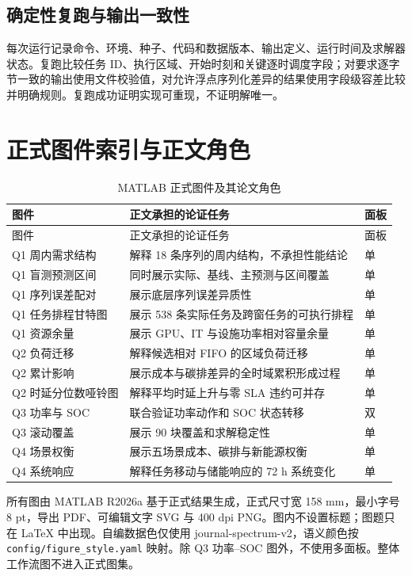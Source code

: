 \subsection{确定性复跑与输出一致性}

每次运行记录命令、环境、种子、代码和数据版本、输出定义、运行时间及求解器状态。复跑比较任务 ID、执行区域、开始时刻和关键逐时调度字段；对要求逐字节一致的输出使用文件校验值，对允许浮点序列化差异的结果使用字段级容差比较并明确规则。复跑成功证明实现可重现，不证明解唯一。

\section{正式图件索引与正文角色}

\begin{longtable}{@{}p{}p{}p{}@{}}
\caption{MATLAB 正式图件及其论文角色}\label{tab:figure-index}\\
\toprule
图件 & 正文承担的论证任务 & 面板 \\
\midrule
\endfirsthead
\toprule
图件 & 正文承担的论证任务 & 面板 \\
\midrule
\endhead
Q1 周内需求结构 & 解释 18 条序列的周内结构，不承担性能结论 & 单 \\
Q1 盲测预测区间 & 同时展示实际、基线、主预测与区间覆盖 & 单 \\
Q1 序列误差配对 & 展示底层序列误差异质性 & 单 \\
Q1 任务排程甘特图 & 展示 538 条实际任务及跨窗任务的可执行排程 & 单 \\
Q1 资源余量 & 展示 GPU、IT 与设施功率相对容量余量 & 单 \\
Q2 负荷迁移 & 解释候选相对 FIFO 的区域负荷迁移 & 单 \\
Q2 累计影响 & 展示成本与碳排差异的全时域累积形成过程 & 单 \\
Q2 时延分位数哑铃图 & 解释平均时延上升与零 SLA 违约可并存 & 单 \\
Q3 功率与 SOC & 联合验证功率动作和 SOC 状态转移 & 双 \\
Q3 滚动覆盖 & 展示 90 块覆盖和求解稳定性 & 单 \\
Q4 场景权衡 & 展示五场景成本、碳排与新能源权衡 & 单 \\
Q4 系统响应 & 解释任务移动与储能响应的 72 h 系统变化 & 单 \\
\bottomrule
\end{longtable}

所有图由 MATLAB R2026a 基于正式结果生成，正式尺寸宽 158 mm，最小字号 8 pt，导出 PDF、可编辑文字 SVG 与 400 dpi PNG。图内不设置标题；图题只在 LaTeX 中出现。自编数据色仅使用 journal-spectrum-v2，语义颜色按 \texttt{config/figure\_style.yaml} 映射。除 Q3 功率--SOC 图外，不使用多面板。整体工作流图不进入正式图集。

